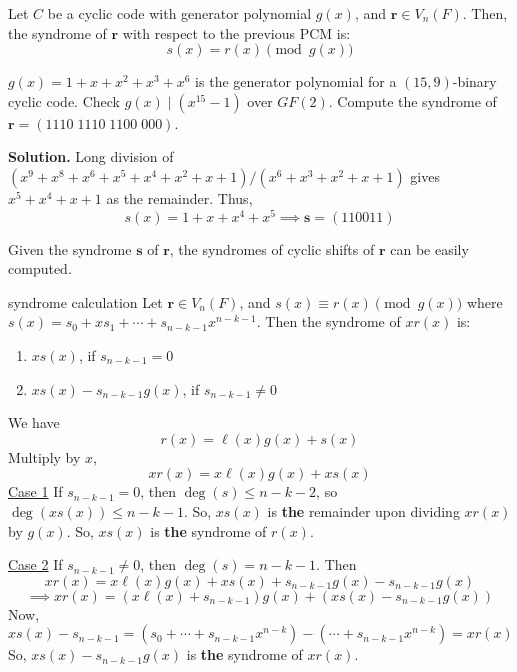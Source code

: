\begin{Theorem}{}{}
    Let $ C $ be a cyclic code with generator polynomial $ g(x) $, and $ \symbf{r}\in V_n(F) $.
    Then, the syndrome of $ \symbf{r} $ with respect to the previous PCM is:
    \[ s(x)=r(x)\pmod{g(x)} \]
\end{Theorem}

\begin{Example}{}{}
    $ g(x)=1+x+x^2+x^3+x^6 $ is the generator polynomial for a $ (15,9) $-binary cyclic code.
    Check $ g(x)\mid (x^{15}-1) $ over $ GF(2) $. Compute the syndrome of
    $ \symbf{r}=(1110\; 1110\; 1100\; 000) $.

    \textbf{Solution.} Long division of $ (x^9+x^8+x^6+x^5+x^4+x^2+x+1)/(x^6+x^3+x^2+x+1) $
    gives $ x^5+x^4+x+1 $ as the remainder. Thus,
    \[ s(x)=1+x+x^4+x^5\implies \symbf{s}=(110011) \]
\end{Example}

\begin{Remark}{}{}
    Given the syndrome $ \symbf{s} $ of $ \symbf{r} $, the syndromes of cyclic shifts of $ \symbf{r} $
    can be easily computed.
\end{Remark}

\begin{Theorem}{}{syndrome calculation}
    Let $ \symbf{r}\in V_n(F) $, and $ s(x) \equiv r(x)\pmod{g(x)} $ where
    $ s(x) = s_0+xs_1+\cdots+s_{n-k-1}x^{n-k-1} $.
    Then the syndrome of $ xr(x) $ is:
    \begin{enumerate}[label=(\roman*)]
        \item $ xs(x) $, if $ s_{n-k-1}=0 $
        \item $ xs(x)-s_{n-k-1}g(x) $, if $ s_{n-k-1}\neq 0 $
    \end{enumerate}
\end{Theorem}

\begin{Proof}{}{}
We have
\[ r(x)=\ell (x)g(x)+s(x) \]
Multiply by $ x $,
\[ xr(x)=x\ell(x)g(x)+xs(x) \]
\underline{Case 1} If $ s_{n-k-1}=0 $, then $ \deg(s)\leqslant n-k-2 $,
so $ \deg(xs(x))\leqslant n-k-1 $. So, $ xs(x) $ is \textbf{the} remainder upon dividing
$ xr(x) $ by $ g(x) $. So, $ xs(x) $ is \textbf{the} syndrome of $ r(x) $.

\underline{Case 2} If $ s_{n-k-1}\neq 0 $, then $ \deg(s)=n-k-1 $. Then
\[ xr(x)=x\ell(x)g(x)+xs(x)+s_{n-k-1}g(x)-s_{n-k-1}g(x) \]
\[ \implies xr(x)=(x\ell(x)+s_{n-k-1})g(x)+(xs(x)-s_{n-k-1}g(x)) \]
Now,
\[ xs(x)-s_{n-k-1}=(s_0+\cdots+s_{n-k-1}x^{n-k})-(\cdots+s_{n-k-1}x^{n-k})=xr(x) \]
So, $ xs(x)-s_{n-k-1}g(x) $ is \textbf{the} syndrome of $ xr(x) $.
\end{Proof}
